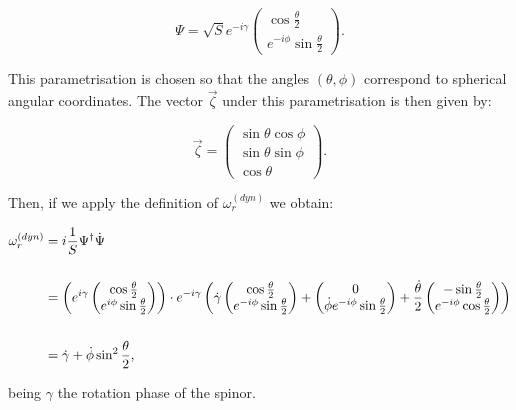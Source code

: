\begin{equation*}
\Psi = \sqrt{S}e^{-i\gamma} \begin{pmatrix}\cos{\frac{\theta}{2}}\\
e^{-i\phi}\sin{\frac{\theta}{2}}\end{pmatrix}.
\end{equation*}

This parametrisation is chosen so that the angles $(\theta,\phi)$ correspond to spherical angular coordinates. The vector $\vec{\zeta}$ under this parametrisation is then given by:

\begin{equation*}
\vec{\zeta} = \begin{pmatrix} \sin{\theta}\cos{\phi}\\ \sin{\theta}\sin{\phi}\\ \cos{\theta} \end{pmatrix}.
\end{equation*}

Then, if we apply the definition of $\omega_r^{(dyn)}$ we obtain:

\begin{align*}
\omega_r^{(dyn)} &= i\frac{1}{S}\Psi^\dagger\dot{\Psi} \\
\\
&= \left( e^{i\gamma}\begin{pmatrix}\cos{\frac{\theta}{2}} \\e^{i\phi}\sin{\frac{\theta}{2}}\end{pmatrix} \right)\cdot e^{-i\gamma}\left( \dot{\gamma}\begin{pmatrix}\cos{\frac{\theta}{2}} \\e^{-i\phi}\sin{\frac{\theta}{2}}\end{pmatrix}+ \begin{pmatrix}0 \\ \dot{\phi}e^{-i\phi}\sin{\frac{\theta}{2}}\end{pmatrix} + \frac{\dot{\theta}}{2}\begin{pmatrix}-\sin{\frac{\theta}{2}} \\e^{-i\phi}\cos{\frac{\theta}{2}}\end{pmatrix} \right)\\
\\
&= \dot{\gamma}+\dot{\phi}\sin^2{\frac{\theta}{2}},
\end{align*}

being $\gamma$ the rotation phase of the spinor.\\

